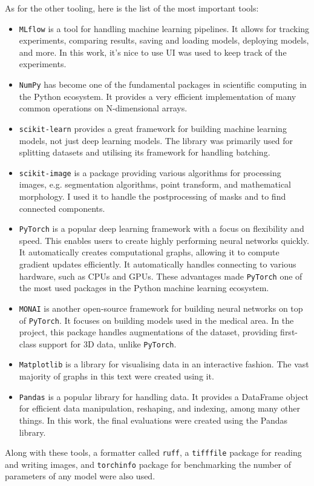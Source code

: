 \documentclass[
  digital,     %
  oneside,     %
  nosansbold,  %
  nocolorbold, %
  lof,         %
  lot,         %
]{fithesis4}
\begin{document}
As for the other tooling, here is the list of the most important tools:
\begin{itemize}
    \item{\texttt{MLflow} \parencite{Zaharia2018MLflow} is a tool for handling machine learning pipelines. It allows for tracking experiments, comparing results, saving and loading models, deploying models, and more. In this work, it's nice to use UI was used to keep track of the experiments.}
    \item{\texttt{NumPy} \parencite{Harris2020Numpy} has become one of the fundamental packages in scientific computing in the Python ecosystem. It provides a very efficient implementation of many common operations on N-dimensional arrays.}
    \item{\texttt{scikit-learn} \parencite{Pedregosa2011scikit} provides a great framework for building machine learning models, not just deep learning models. The library was primarily used for splitting datasets and utilising its framework for handling batching. }
    \item{\texttt{scikit-image} \parencite{vanderWalt2014skimage} is a package providing various algorithms for processing images, e.g. segmentation algorithms, point transform, and mathematical morphology. I used it to handle the postprocessing of masks and to find connected components.}
    \item{\texttt{PyTorch} \parencite{Ansel2024PyTorch} is a popular deep learning framework with a focus on flexibility and speed. This enables users to create highly performing neural networks quickly. It automatically creates computational graphs, allowing it to compute gradient updates efficiently. It automatically handles connecting to various hardware, such as CPUs and GPUs. These advantages made \texttt{PyTorch} one of the most used packages in the Python machine learning ecosystem.}
    \item{\texttt{MONAI} \parencite{Cardoso2022Monai}is another open-source framework for building neural networks on top of \texttt{PyTorch}. It focuses on building models used in the medical area. In the project, this package handles augmentations of the dataset, providing first-class support for 3D data, unlike \texttt{PyTorch}.}
    \item{\texttt{Matplotlib} \parencite{Hunter2007Matplotlib} is a library for visualising data in an interactive fashion. The vast majority of graphs in this text were created using it.}
    \item{\texttt{Pandas} \parencite{Pandas} is a popular library for handling data. It provides a DataFrame object for efficient data manipulation, reshaping, and indexing, among many other things. In this work, the final evaluations were created using the Pandas library.}
\end{itemize}
Along with these tools, a formatter called \texttt{ruff}, a \texttt{tifffile} package for reading and writing images, and \texttt{torchinfo} package for benchmarking the number of parameters of any model were also used.
\end{document}
